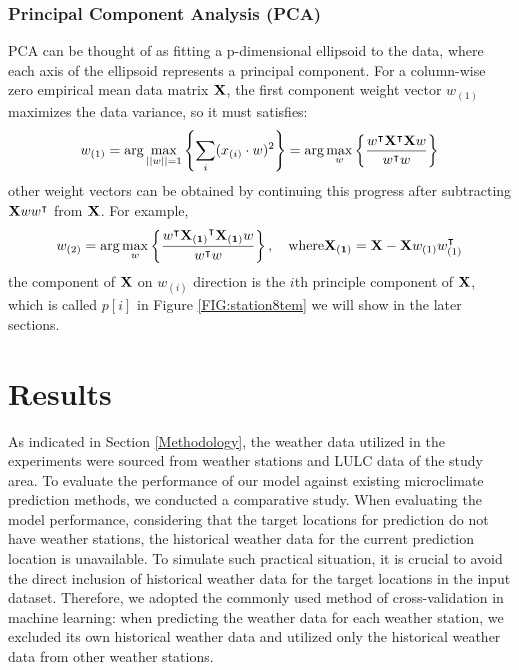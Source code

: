 \documentclass[a4paper,fleqn]{cas-sc}
\begin{document}
\subsubsection{ Principal Component Analysis (PCA)}\label{PCA}
PCA can be thought of as fitting a p-dimensional ellipsoid to the data, where each axis of the ellipsoid represents a principal component. For a column-wise zero empirical mean data matrix $\bold{X}$, the first component weight vector $w_{(1)}$ maximizes the data variance, so it must satisfies:
\begin{equation}
    w_{(1)}=\text{arg}\max_{||w||=1}\left\{ \sum_{i}(x_{(i)}\cdot w)^2\right\}=\text{arg}\max_{w}\left\{ \frac{w^\intercal\bold{X}^\intercal\bold{X} w}{w^\intercal w}\right\}
\end{equation}
other weight vectors can be obtained by continuing this progress after subtracting $\bold{X}ww^\intercal$ from $\bold{X}$. For example,
\begin{equation}
    w_{(2)}=\text{arg}\max_{w}\left\{ \frac{w^\intercal\bold{X_{(1)}}^\intercal\bold{X_{(1)}} w}{w^\intercal w}\right\},\quad \text{where} \bold{X_{(1)}}=\bold{X}-\bold{X}w_{(1)}w_{(1)}^\intercal
\end{equation}
the component of $\bold{X}$ on $w_{(i)}$ direction is the $i$th principle component of $\bold{X}$, which is called $p[i]$ in Figure \ref{FIG:station8tem} we will show in the later sections.

\section{Results}\label{Results}

As indicated in Section \ref{Methodology}, the weather data utilized in the experiments were sourced from weather stations and LULC data of the study area. To evaluate the performance of our model against existing microclimate prediction methods, we conducted a comparative study. When evaluating the model performance, considering that the target locations for prediction do not have weather stations, the historical weather data for the current prediction location is unavailable. To simulate such practical situation, it is crucial to avoid the direct inclusion of historical weather data for the target locations in the input dataset. Therefore, we adopted the commonly used method of cross-validation in machine learning: when predicting the weather data for each weather station, we excluded its own historical weather data and utilized only the historical weather data from other weather stations.
\end{document}
